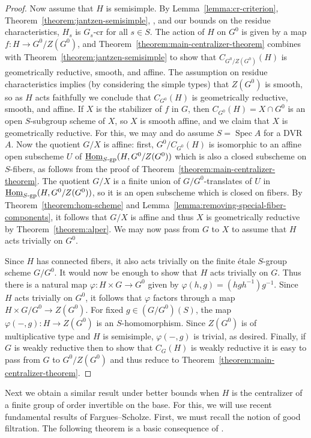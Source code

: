 \documentclass[11pt, letterpaper,english]{amsart}
\theoremstyle{plain}
\theoremstyle{definition}
\numberwithin{equation}{section}
\numberwithin{lem}{section}
\newcommand{\vp}{\varphi}
\DeclareMathOperator{\Hom}{Hom}
\DeclareMathOperator{\Spec}{Spec}
\begin{document}
\begin{proof}
    Now assume that $H$ is semisimple. By Lemma~\ref{lemma:cr-criterion}, Theorem~\ref{theorem:jantzen-semisimple}, \cite[Corollary 3.42]{BMR05}, and our bounds on the residue characteristics, $H_s$ is $G_s$-cr for all $s \in S$. The action of $H$ on $G^0$ is given by a map $f: H \to G^0/Z(G^0)$, and Theorem~\ref{theorem:main-centralizer-theorem} combines with Theorem~\ref{theorem:jantzen-semisimple} to show that $C_{G^0/Z(G^0)}(H)$ is geometrically reductive, smooth, and affine.
    The assumption on residue characteristics implies (by considering the simple types) that $Z(G^0)$ is smooth, so as $H$ acts faithfully we conclude that $C_{G^0}(H)$ is geometrically reductive, smooth, and affine. If $X$ is the stabilizer of $f$ in $G$, then $C_{G^0}(H) = X \cap G^0$ is an open $S$-subgroup scheme of $X$, so $X$ is smooth affine, and we claim that $X$ is geometrically reductive. For this, we may and do assume $S = \Spec A$ for a DVR $A$. Now the quotient $G/X$ is affine: first, $G^0/C_{G^0}(H)$ is isomorphic to an affine open subscheme $U$ of $\underline{\Hom}_{S\textrm{-}\rm{gp}}(H, G^0/Z(G^0))$ which is also a closed subscheme on $S$-fibers, as follows from the proof of Theorem~\ref{theorem:main-centralizer-theorem}. The quotient $G/X$ is a finite union of $G/G^0$-translates of $U$ in $\underline{\Hom}_{S\textrm{-}\rm{gp}}(H, G^0/Z(G^0))$, so it is an open subscheme which is closed on fibers. By Theorem~\ref{theorem:hom-scheme} and Lemma~\ref{lemma:removing-special-fiber-components}, it follows that $G/X$ is affine and thus $X$ is geometrically reductive by Theorem~\ref{theorem:alper}. We may now pass from $G$ to $X$ to assume that $H$ acts trivially on $G^0$.

    Since $H$ has connected fibers, it also acts trivially on the finite \'etale $S$-group scheme $G/G^0$. It would now be enough to show that $H$ acts trivially on $G$. Thus there is a natural map $\vp: H \times G \to G^0$ given by $\vp(h, g) = (hgh^{-1})g^{-1}$. Since $H$ acts trivially on $G^0$, it follows that $\vp$ factors through a map $H \times G/G^0 \to Z(G^0)$. For fixed $g \in (G/G^0)(S)$, the map $\vp(-, g): H \to Z(G^0)$ is an $S$-homomorphism. Since $Z(G^0)$ is of multiplicative type and $H$ is semisimple, $\vp(-, g)$ is trivial, as desired. Finally, if $G$ is weakly reductive then to show that $C_G(H)$ is weakly reductive it is easy to pass from $G$ to $G^0/Z(G^0)$ and thus reduce to Theorem~\ref{theorem:main-centralizer-theorem}.
\end{proof}

Next we obtain a similar result under better bounds when $H$ is the centralizer of a finite group of order invertible on the base. For this, we will use recent fundamental results of Fargues--Scholze. First, we must recall the notion of good filtration. The following theorem is a basic consequence of \cite[Proposition VIII.5.12]{Fargues-Scholze}.
\end{document}
